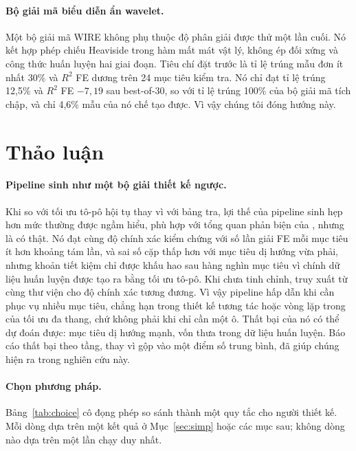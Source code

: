 \documentclass[a4paper,11pt]{article}
\newcommand{\RR}{R^2}
\begin{document}
\paragraph{Bộ giải mã biểu diễn ẩn wavelet.}
Một bộ giải mã WIRE không phụ thuộc độ phân giải \citep{saragadam2023wire}
được thử một lần cuối. Nó kết hợp phép chiếu Heaviside trong hàm mất mát vật
lý, không ép đối xứng và công thức huấn luyện hai giai đoạn. Tiêu chí đặt
trước là tỉ lệ trúng mẫu đơn ít nhất 30\% và $\RR$ FE dương trên 24 mục tiêu
kiểm tra. Nó chỉ đạt tỉ lệ trúng 12,5\% và $\RR$ FE $-7,19$ sau best-of-30,
so với tỉ lệ trúng 100\% của bộ giải mã tích chập, và chỉ 4,6\% mẫu của nó
chế tạo được. Vì vậy chúng tôi đóng hướng này.

\section{Thảo luận}

\paragraph{Pipeline sinh như một bộ giải thiết kế ngược.}
Khi so với tối ưu tô-pô hội tụ thay vì với bảng tra, lợi thế của pipeline
sinh hẹp hơn mức thường được ngầm hiểu, phù hợp với tổng quan phản biện của
\citet{woldseth2022use}, nhưng là có thật. Nó đạt cùng độ chính xác kiểm
chứng với số lần giải FE mỗi mục tiêu ít hơn khoảng tám lần, và sai số cặp
thấp hơn với mục tiêu dị hướng vừa phải, nhưng khoản tiết kiệm chỉ được khấu
hao sau hàng nghìn mục tiêu vì chính dữ liệu huấn luyện được tạo ra bằng tối
ưu tô-pô. Khi chưa tinh chỉnh, truy xuất từ cùng thư viện cho độ chính xác
tương đương. Vì vậy pipeline hấp dẫn khi cần phục vụ nhiều mục tiêu, chẳng
hạn trong thiết kế tương tác hoặc vòng lặp trong của tối ưu đa thang, chứ
không phải khi chỉ cần một ô. Thất bại của nó có thể dự đoán được: mục tiêu
dị hướng mạnh, vốn thưa trong dữ liệu huấn luyện. Báo cáo thất bại theo tầng,
thay vì gộp vào một điểm số trung bình, đã giúp chúng hiện ra trong nghiên
cứu này.

\paragraph{Chọn phương pháp.}
Bảng~\ref{tab:choice} cô đọng phép so sánh thành một quy tắc cho người thiết
kế. Mỗi dòng dựa trên một kết quả ở Mục~\ref{sec:simp} hoặc các mục sau;
không dòng nào dựa trên một lần chạy duy nhất.
\end{document}
